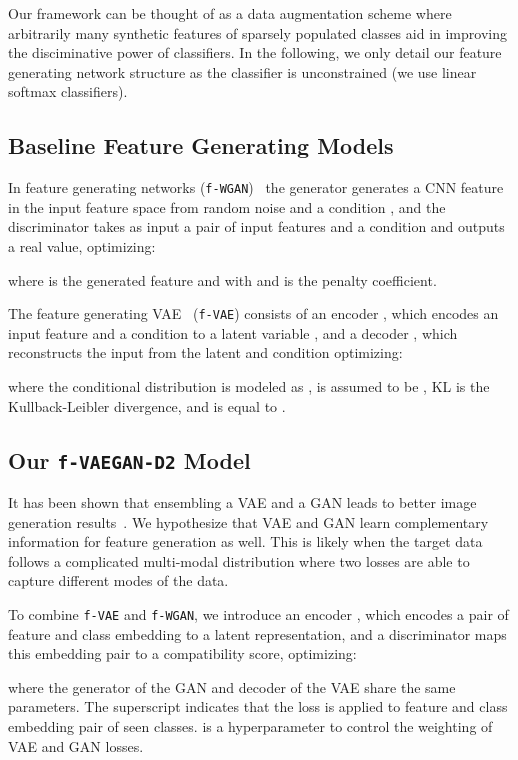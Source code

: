 \documentclass[10pt,twocolumn,letterpaper]{article}
\begin{document}
Our framework can be thought of as a data augmentation scheme where arbitrarily many synthetic features of sparsely populated classes aid in improving the disciminative power of classifiers. In the following, we only detail our feature generating network structure as the classifier is unconstrained (we use linear softmax classifiers).    


\subsection{Baseline Feature Generating Models}
In feature generating networks (\texttt{f-WGAN})~\cite{XLSA18} the generator  generates a CNN feature  in the input feature space  from random noise  and a condition , and the discriminator  takes as input a pair of input features  and a condition  and outputs a real value, optimizing:

where  is the generated feature and  with  and  is the penalty coefficient. 

The feature generating VAE~\cite{kingma2013auto} (\texttt{f-VAE}) consists of an encoder , which encodes an input feature  and a condition  to a latent variable , and a decoder , which reconstructs the input  from the latent  and condition  optimizing:  

where the conditional distribution  is modeled as ,  is assumed to be , KL is the Kullback-Leibler divergence, and  is equal to . 

\subsection{Our \textbf{\texttt{f-VAEGAN-D2}} Model}
It has been shown that ensembling a VAE and a GAN leads to better image generation results~\cite{larsen2015autoencoding}. We hypothesize that VAE and GAN learn complementary information for feature generation as well. This is likely when the target data follows a complicated multi-modal distribution where two losses are able to capture different modes of the data.

To combine \texttt{f-VAE} and \texttt{f-WGAN}, we introduce an encoder , which encodes a pair of feature and class embedding to a latent representation, and a discriminator  maps this embedding pair to a compatibility score, optimizing: 

where the generator  of the GAN and decoder  of the VAE share the same parameters.  
The superscript  indicates that the loss is applied to feature and class embedding pair of seen classes.  is a hyperparameter to  control the weighting of VAE and GAN losses. 
\end{document}
